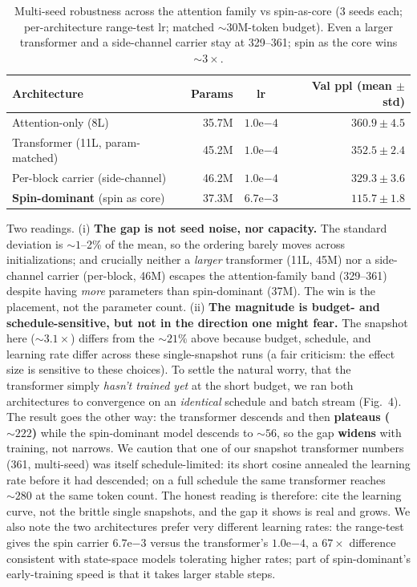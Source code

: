 \documentclass[11pt]{article}
\begin{document}
\begin{table}[h]\centering\small
\caption{Multi-seed robustness across the attention family vs spin-as-core (3 seeds each; per-architecture range-test lr; matched ${\sim}30$M-token budget). Even a larger transformer and a side-channel carrier stay at 329--361; spin as the core wins ${\sim}3\times$.}
\begin{tabular}{@{}l r c r@{}}
\toprule
Architecture & Params & lr & Val ppl (mean $\pm$ std) \\
\midrule
Attention-only (8L) & 35.7M & $1.0\mathrm{e}{-4}$ & $360.9 \pm 4.5$ \\
Transformer (11L, param-matched) & 45.2M & $1.0\mathrm{e}{-4}$ & $352.5 \pm 2.4$ \\
Per-block carrier (side-channel) & 46.2M & $1.0\mathrm{e}{-4}$ & $329.3 \pm 3.6$ \\
\textbf{Spin-dominant} (spin as core) & 37.3M & $6.7\mathrm{e}{-3}$ & $\mathbf{115.7 \pm 1.8}$ \\
\bottomrule
\end{tabular}
\end{table}

Two readings. (i) \textbf{The gap is not seed noise, nor capacity.} The standard deviation is ${\sim}1$--2\% of the mean, so the ordering barely moves across initializations; and crucially neither a \emph{larger} transformer (11L, 45M) nor a side-channel carrier (per-block, 46M) escapes the attention-family band (329--361) despite having \emph{more} parameters than spin-dominant (37M). The win is the placement, not the parameter count. (ii) \textbf{The magnitude is budget- and schedule-sensitive, but not in the direction one might fear.} The snapshot here (${\sim}3.1\times$) differs from the ${\sim}21\%$ above because budget, schedule, and learning rate differ across these single-snapshot runs (a fair criticism: the effect size is sensitive to these choices). To settle the natural worry, that the transformer simply \emph{hasn't trained yet} at the short budget, we ran both architectures to convergence on an \emph{identical} schedule and batch stream (Fig.~4). The result goes the other way: the transformer descends and then \textbf{plateaus (${\sim}222$)} while the spin-dominant model descends to ${\sim}56$, so the gap \textbf{widens} with training, not narrows. We caution that one of our snapshot transformer numbers (361, multi-seed) was itself schedule-limited: its short cosine annealed the learning rate before it had descended; on a full schedule the same transformer reaches ${\sim}280$ at the same token count. The honest reading is therefore: cite the learning curve, not the brittle single snapshots, and the gap it shows is real and grows. We also note the two architectures prefer very different learning rates: the range-test gives the spin carrier $6.7\mathrm{e}{-3}$ versus the transformer's $1.0\mathrm{e}{-4}$, a $67\times$ difference consistent with state-space models tolerating higher rates; part of spin-dominant's early-training speed is that it takes larger stable steps.
\end{document}
